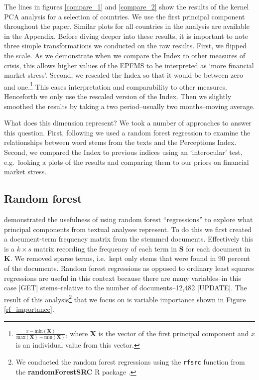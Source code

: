 \documentclass[]{article}
\begin{document}
The lines in figures \ref{compare_1} and \ref{compare_2} show the
results of the kernel PCA analysis for a selection of countries. We use
the first principal component throughout the paper. Similar plots for
all countries in the analysis are available in the Appendix. Before
diving deeper into these results, it is important to note three simple
transformations we conducted on the raw results. First, we flipped the
scale. As we demonstrate when we compare the Index to other measures of
crisis, this allows higher values of the EPFMS to be interpreted as
`more financial market stress'. Second, we rescaled the Index so that it
would be between zero and one.\footnote{\(\frac{x - \mathrm{min}(\bm{X})}{\mathrm{max}(\bm{X}) - \mathrm{min}(\bm{X})}\),
  where \(\bm{X}\) is the vector of the first principal component and
  \(x\) is an individual value from this vector.} This eases
interpretation and comparability to other measures. Henceforth we only
use the rescaled version of the Index. Then we slightly smoothed the
results by taking a two period--usually two months--moving average.

What does this dimension represent? We took a number of approaches to
answer this question. First, following \cite{Spirling2012} we used a random
forest regression \citep{Breiman2001,jones2015} to examine the
relationships between word stems from the texts and the Perceptions
Index. Second, we compared the Index to previous indices using an
`interocular' test, e.g.~looking a plots of the results and comparing
them to our priors on financial market stress.

\subsection{Random forest}\label{random-forest}

\cite[6--8]{Spirling2012} demonstrated the usefulness of using random forest
``regressions'' to explore what principal components from textual
analyses represent. To do this we first created a document-term
frequency matrix from the stemmed documents. Effectively this is a
\(k \times s\) matrix recording the frequency of each term in \(\bm{S}\)
for each document in \(\bm{K}\). We removed sparse terms, i.e.~kept only
stems that were found in 90 percent of the documents. Random forest
regressions as opposed to ordinary least squares regressions are useful
in this context because there are many variables--in this case {[}GET{]}
stems--relative to the number of documents--12,482 {[}UPDATE{]}. The
result of this analysis\footnote{We conducted the random forest
  regressions using the \texttt{rfsrc} function from the
  \textbf{randomForestSRC} R package \citep{randomForestSRCCite}.} that
we focus on is variable importance shown in Figure \ref{rf_importance}.
\end{document}
